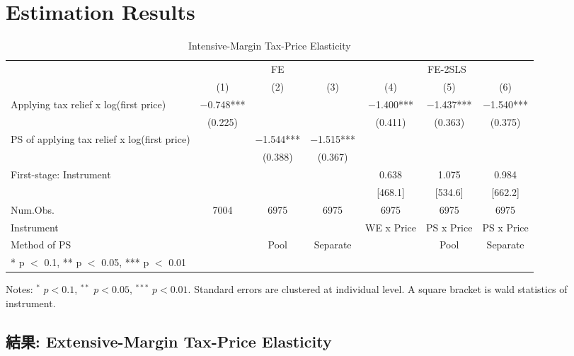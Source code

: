 \documentclass[
  11pt,
  a4paper,
]{article}
\begin{document}
\hypertarget{result}{%
\section{Estimation Results}\label{result}}

\begin{table}

\caption{\label{tab:MainIntensive}Intensive-Margin Tax-Price Elasticity}
\centering
\fontsize{7}{9}\selectfont
\begin{threeparttable}
\begin{tabular}[t]{lcccccc}
\toprule
\multicolumn{1}{c}{ } & \multicolumn{3}{c}{FE} & \multicolumn{3}{c}{FE-2SLS} \\
\cmidrule(l{3pt}r{3pt}){2-4} \cmidrule(l{3pt}r{3pt}){5-7}
  & (1) & (2) & (3) & (4) & (5) & (6)\\
\midrule
Applying tax relief x log(first price) & \num{-0.748}*** &  &  & \num{-1.400}*** & \num{-1.437}*** & \num{-1.540}***\\
 & (\num{0.225}) &  &  & (\num{0.411}) & (\num{0.363}) & (\num{0.375})\\
PS of applying tax relief x log(first price) &  & \num{-1.544}*** & \num{-1.515}*** &  &  & \\
 &  & (\num{0.388}) & (\num{0.367}) &  &  & \\
\midrule
First-stage: Instrument &  &  &  & 0.638 & 1.075 & 0.984\\
 &  &  &  & {}[468.1] & {}[534.6] & {}[662.2]\\
Num.Obs. & \num{7004} & \num{6975} & \num{6975} & \num{6975} & \num{6975} & \num{6975}\\
Instrument &  &  &  & WE x Price & PS x Price & PS x Price\\
Method of PS &  & Pool & Separate &  & Pool & Separate\\
\bottomrule
\multicolumn{7}{l}{\rule{0pt}{1em}* p $<$ 0.1, ** p $<$ 0.05, *** p $<$ 0.01}\\
\end{tabular}
\begin{tablenotes}
\item Notes: $^{*}$ $p < 0.1$, $^{**}$ $p < 0.05$, $^{***}$ $p < 0.01$. Standard errors are clustered at individual level. A square bracket is wald statistics of instrument.
\end{tablenotes}
\end{threeparttable}
\end{table}

\hypertarget{ux7d50ux679c-extensive-margin-tax-price-elasticity}{%
\subsection{結果: Extensive-Margin Tax-Price Elasticity}\label{ux7d50ux679c-extensive-margin-tax-price-elasticity}}
\end{document}
